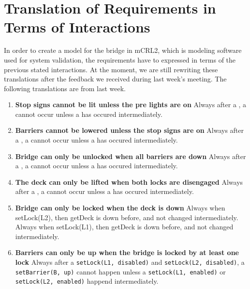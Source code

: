 \section{Translation of Requirements in Terms of Interactions}

In order to create a model for the bridge in mCRL2, which is modeling software used for system validation, the requirements have to expressed in terms of the previous stated interactions. At the moment, we are still rewriting these translations after the feedback we received during last week's meeting. The following translations are from last week.

\begin{enumerate}
	\item \textbf{Stop signs cannot be lit unless the pre lights are on}
	Always after a , a  cannot occur unless a  has occured intermediately.

	\item \textbf{Barriers cannot be lowered unless the stop signs are on}
	Always after a , a  cannot occur unless a  has occured intermediately.

	\item \textbf{Bridge can only be unlocked when all barriers are down}
	Always after a , a  cannot occur unless a  has occured intermediately.

	\item	\textbf{The deck can only be lifted when both locks are disengaged}
	Always after a , a  cannot occur unless a  has occured intermediately.

	\item \textbf{Bridge can only be locked when the deck is down}
	Always when setLock(L2), then getDeck is down before, and not changed intermediately.
	Always when setLock(L1), then getDeck is down before, and not changed intermediately.

	\item \textbf{Barriers can only be up when the bridge is locked by at least one lock}
	Always after a \texttt{setLock(L1, disabled)} and \texttt{setLock(L2, disabled)}, a \texttt{setBarrier(B, up)} cannot happen unless a \texttt{setLock(L1, enabled)} or \texttt{setLock(L2, enabled)} happend intermediately.


\end{enumerate}
